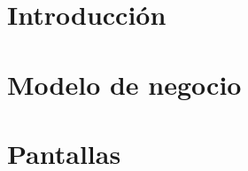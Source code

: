 \documentclass[10pt]{book}
\begin{document}
	
	\thispagestyle{empty}
	
	\maketitle
	
	\makeDocInfo
	\vspace{0.5cm}
	\makeElemRefs
	\makeDocRefs
	\makeObservaciones[3cm] 
	\vspace{0.5cm}
	\makeFirmas
	
	\frontmatter
	\tableofcontents
	\mainmatter
	
	
	\chapter{Introducción}\label{chp:introduccion}
	

	
	\chapter{Modelo de negocio}\label{chp:modeloNegocios} 
	
	\chapter{Pantallas}\label{chp:pantallas}
	
\end{document}
